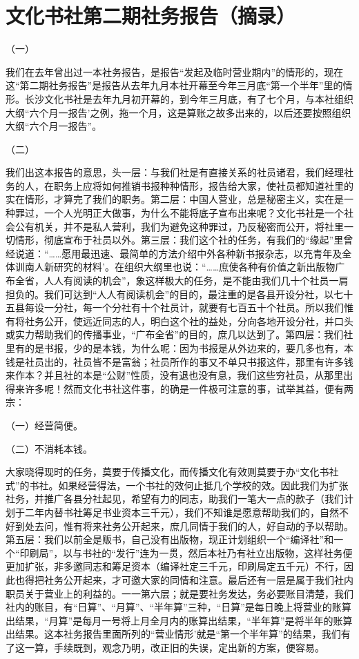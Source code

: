 \section{文化书社第二期社务报告（摘录）}



（一）

我们在去年曾出过一本社务报告，是报告“发起及临时营业期内”的情形的，现在这“第二期社务报告”是报告从去年九月本社开幕至今年三月底“第一个半年”里的情形。长沙文化书社是去年九月初开幕的，到今年三月底，有了七个月，与本社组织大纲“六个月一报告’之例，拖一个月，这是算账之故多出来的，以后还要按照组织大纲“六个月一报告”。

（二）

我们出这本报告的意思，头一层：与我们社是有直接关系的社员诸君，我们经理社务的人，在职务上应将如何推销书报种种情形，报告给大家，使社员都知道社里的实在情形，才算完了我们的职务。第二层：中国人营业，总是秘密主义，实在是一种罪过，一个人光明正大做事，为什么不能将底子宣布出来呢？文化书社是一个社会公有机关，并不是私人营利，我们为避免这种罪过，乃反秘密而公开，将社里一切情形，彻底宣布于社员以外。第三层：我们这个社的任务，有我们的“缘起”里曾经说道：“……愿用最迅速、最简单的方法介绍中外各种新书报杂志，以充青年及全体训南人新研究的材料’。在组织大纲里也说：“……庶使各种有价值之新出版物广布全省，人人有阅读的机会”，象这样极大的任务，是不能由我们几十个社员一肩担负的。我们可达到“人人有阅读机会”的目的，最注重的是各县开设分社，以七十五县每设一分社，每一个分社有十个社员计，就要有七百五十个社员。所以我们惟有将社务公开，使远近同志的人，明白这个社的益处，分向各地开设分社，并口头或实力帮助我们的传播事业，“广布全省”的目的，庶几以达到了。第四层：我们社里有的是书报，少的是本钱，为什么呢：因为书报是从外边来的，要几多也有，本钱是社员出的，社员皆不是富翁；社员所作的事又不单只书报这件，那里有许多钱来作本？并且社的本是“公财”性质，没有退也没有息，我们这些穷社员，从那里出得来许多呢！然而文化书社这件事，的确是一件极可注意的事，试举其益，便有两宗：

（一）经营简便。

（二）不消耗本钱。

大家晓得现时的任务，莫要于传播文化，而传播文化有效则莫要于办“文化书社式”的书社。如果经营得法，一个书社的效何止抵几个学校的效。因此我们为扩张社务，并推广各县分社起见，希望有力的同志，助我们一笔大一点的款子（我们计划于二年内替书社筹足书业资本三千元），我们不知谁是愿意帮助我们的，自然不好到处去问，惟有将来社务公开起来，庶几同情于我们的人，好自动的予以帮助。第五层：我们以前全是贩书，自己没有出版物，现正计划组织一个“编译社”和一个“印刷局”，以与书社的“发行”连为一贯，然后本社乃有社立出版物，这样社务便更加扩张，非多邀同志和筹足资本（编译社定三千元，印刷局定五千元）不行，因此也得把社务公开起来，才可邀大家的同情和注意。最后还有一层是属于我们社内职员关于营业上的利益的。一一第六层；就是要社务发达，务必要账目清楚，我们社内的账目，有“日算”、“月算”、“半年算”三种，“日算”是每日晚上将营业的账算出结果，“月算”是每月一号将上月全月内的账算出结果，“半年算”是将半年的账算出结果。这本社务报告里面所列的“营业情形’就是“第一个半年算”的结果，我们有了这一算，手续既到，观念乃明，改正旧的失误，定出新的方案，便容易。

